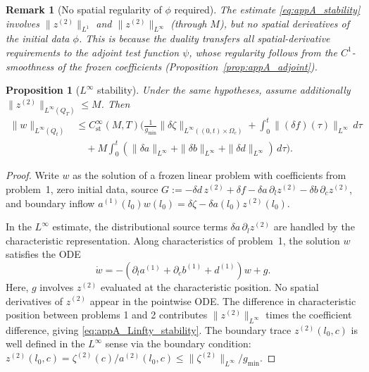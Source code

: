 \documentclass[pdflatex,sn-mathphys-num]{sn-jnl}%
\newtheorem{proposition}[theorem]{Proposition}
\newtheorem{remark}[theorem]{Remark}
\begin{document}
\begin{remark}[No spatial regularity of \(\phi\) required]
The estimate \eqref{eq:appA_stability} involves \(\|z^{(2)}\|_{L^1}\) and
\(\|z^{(2)}\|_{L^\infty}\) (through \(M\)), but \emph{no} spatial derivatives of the
initial data \(\phi\). This is because the duality transfers all spatial-derivative
requirements to the adjoint test function \(\psi\), whose regularity follows from the
\(C^1\)-smoothness of the frozen coefficients (Proposition~\ref{prop:appA_adjoint}).
\end{remark}

\begin{proposition}[\(L^\infty\) stability]\label{prop:appA_Linfty_stability}
Under the same hypotheses, assume additionally
\(\|z^{(2)}\|_{L^\infty(Q_T)}\le M\). Then
\begin{equation}\label{eq:appA_Linfty_stability}
\begin{aligned}
\|w\|_{L^\infty(Q_t)}
&\le C_{\mathrm{st}}^\infty(M,T)\Big(
\frac{1}{g_{\min}}\|\delta\zeta\|_{L^\infty((0,t)\times\Omega_c)}
+\int_0^t\|(\delta f)(\tau)\|_{L^\infty}\,d\tau
\\
&\quad
+M\int_0^t
(\|\delta a\|_{L^\infty}+\|\delta b\|_{L^\infty}+\|\delta d\|_{L^\infty})\,d\tau
\Big).
\end{aligned}
\end{equation}
\end{proposition}
\begin{proof}
Write \(w\) as the solution of a frozen linear problem with coefficients from problem~1,
zero initial data, source
\(G:=-\delta d\, z^{(2)}+\delta f-\delta a\,\partial_l z^{(2)}-\delta b\,\partial_c z^{(2)}\),
and boundary inflow
\(a^{(1)}(l_0)w(l_0)=\delta\zeta-\delta a(l_0)z^{(2)}(l_0)\).

In the \(L^\infty\) estimate, the distributional source terms
\(\delta a\,\partial_l z^{(2)}\) are handled by the characteristic representation.
Along characteristics of problem~1, the solution \(w\) satisfies the ODE
\[
\dot w=-(\partial_l a^{(1)}+\partial_c b^{(1)}+d^{(1)})w+g.
\]
Here, \(g\) involves \(z^{(2)}\) evaluated at the characteristic position. No spatial derivatives of \(z^{(2)}\) appear in the pointwise ODE.
The difference in characteristic position between problems 1 and 2 contributes
\(\|z^{(2)}\|_{L^\infty}\) times the coefficient difference, giving
\eqref{eq:appA_Linfty_stability}. The boundary trace
\(z^{(2)}(l_0,c)\) is well defined in the \(L^\infty\) sense via the
boundary condition: \(z^{(2)}(l_0,c)=\zeta^{(2)}(c)/a^{(2)}(l_0,c)\le
\|\zeta^{(2)}\|_{L^\infty}/g_{\min}\).
\end{proof}
\end{document}
